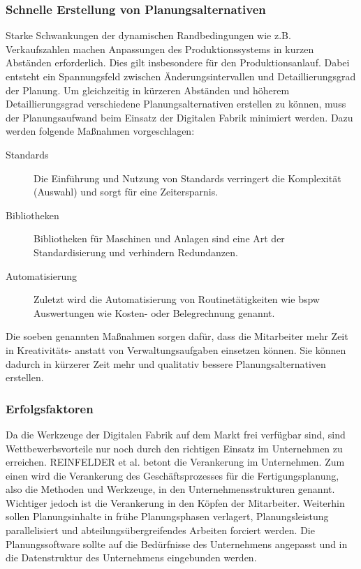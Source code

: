 \subsubsection{Schnelle Erstellung von Planungsalternativen}

Starke Schwankungen der dynamischen Randbedingungen wie z.B. Verkaufszahlen machen Anpassungen des Produktionssystems in kurzen Abständen erforderlich. Dies gilt insbesondere für den Produktionsanlauf. Dabei entsteht ein Spannungsfeld zwischen Änderungsintervallen und Detaillierungsgrad der Planung. Um gleichzeitig in kürzeren Abständen und höherem Detaillierungsgrad verschiedene Planungsalternativen erstellen zu können, muss der Planungsaufwand beim Einsatz der Digitalen Fabrik minimiert werden. 
Dazu werden folgende Maßnahmen vorgeschlagen: 
\begin{description}
\item[Standards] Die Einführung und Nutzung von Standards verringert die Komplexität (Auswahl) und sorgt für eine Zeitersparnis.
 \item[Bibliotheken] Bibliotheken für Maschinen und Anlagen sind eine Art der Standardisierung und verhindern Redundanzen.
 \item[Automatisierung] Zuletzt wird die Automatisierung von Routinetätigkeiten wie \gls{bspw} Auswertungen wie Kosten- oder Belegrechnung genannt. 
\end{description}


%
% 
Die soeben genannten Maßnahmen sorgen dafür, dass die Mitarbeiter mehr Zeit in Kreativitäts- anstatt von Verwaltungsaufgaben einsetzen können. Sie können dadurch in kürzerer Zeit mehr und qualitativ bessere Planungsalternativen erstellen. 

\subsubsection{Erfolgsfaktoren}

Da die Werkzeuge der Digitalen Fabrik auf dem Markt frei verfügbar sind, sind Wettbewerbsvorteile nur noch durch den richtigen Einsatz im Unternehmen zu erreichen. 
REINFELDER et al. betont die Verankerung im Unternehmen. Zum einen wird die Verankerung des Geschäftsprozesses für die Fertigungsplanung, also die Methoden und Werkzeuge, in den Unternehmensstrukturen genannt. Wichtiger jedoch ist die Verankerung in den Köpfen der Mitarbeiter. 
Weiterhin sollen Planungsinhalte in frühe Planungsphasen verlagert, Planungsleistung parallelisiert und abteilungsübergreifendes Arbeiten forciert werden. Die Planungssoftware sollte auf die Bedürfnisse des Unternehmens angepasst und in die Datenstruktur des Unternehmens eingebunden werden. 

